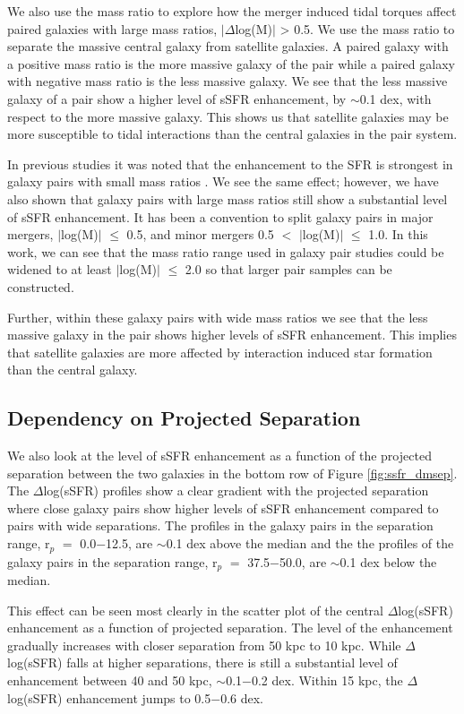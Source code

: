 \documentclass[iop,revtex4,twocolumn,apj,numberedappendix,appendixfloats]{emulateapj}
\begin{document}
We also use the mass ratio to explore how the merger induced tidal torques affect paired galaxies with large mass ratios, $|\Delta$log(M)$|$ > 0.5. We use the mass ratio to separate the massive central galaxy from satellite galaxies. A paired galaxy with a positive mass ratio is the more massive galaxy of the pair while a paired galaxy with negative mass ratio is the less massive galaxy. We see that the less massive galaxy of a pair show a higher level of sSFR enhancement, by $\sim$0.1 dex, with respect to the more massive galaxy. This shows us that satellite galaxies may be more susceptible to tidal interactions than the central galaxies in the pair system. 

In previous studies it was noted that the enhancement to the SFR is strongest in galaxy pairs with small mass ratios \citet{Ellison:2008}. We see the same effect; however, we have also shown that galaxy pairs with large mass ratios still show a substantial level of sSFR enhancement. It has been a convention to split galaxy pairs in major mergers, $|$log(M)$|$ $\le$ 0.5, and minor mergers 0.5 $<$ $|$log(M)$|$ $\le$ 1.0. In this work, we can see that the mass ratio range used in galaxy pair studies could be widened to at least $|$log(M)$|$ $\le$ 2.0 so that larger pair samples can be constructed.  

Further, within these galaxy pairs with wide mass ratios we see that the less massive galaxy in the pair shows higher levels of sSFR enhancement. This implies that satellite galaxies are more affected by interaction induced star formation than the central galaxy. 

\subsection{Dependency on Projected Separation}\label{sec:sep}

We also look at the level of sSFR enhancement as a function of the projected separation between the two galaxies in the bottom row of Figure \ref{fig:ssfr_dmsep}. The $\Delta$log(sSFR) profiles show a clear gradient with the projected separation where close galaxy pairs show higher levels of sSFR enhancement compared to pairs with wide separations. The profiles in the galaxy pairs in the separation range, r$_p$ $=$ 0.0$-$12.5, are $\sim$0.1 dex above the median and the the profiles of the galaxy pairs in the separation range, r$_p$ $=$ 37.5$-$50.0, are $\sim$0.1 dex below the median. 

This effect can be seen most clearly in the scatter plot of the central $\Delta$log(sSFR) enhancement as a function of projected separation. The level of the enhancement gradually increases with closer separation from 50 kpc to 10 kpc. While $\Delta$log(sSFR) falls at higher separations, there is still a substantial level of enhancement between 40 and 50 kpc, $\sim$0.1$-$0.2 dex. Within 15 kpc, the $\Delta$log(sSFR) enhancement jumps to 0.5$-$0.6 dex. 
\end{document}
